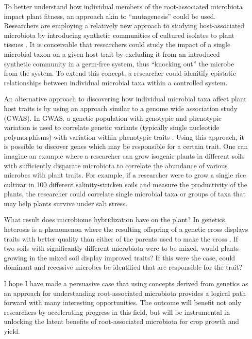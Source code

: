 To better understand how individual members of the root-associated microbiota impact plant fitness, an approach akin to ``mutagenesis'' could be used. Researchers are employing a relatively new approach to studying host-associated microbiota by introducing synthetic communities of cultured isolates to plant tissues \cite{bodenhausen2014synthetic,bai2015functional,lebeis2015salicylic}. It is conceivable that researchers could study the impact of a single microbial taxon on a given host trait by excluding it from an introduced synthetic community in a germ-free system, thus ``knocking out'' the microbe from the system. To extend this concept, a researcher could idenitify epistatic relationships between individual microbial taxa within a controlled system.

An alternative approach to discovering how individual microbial taxa affect plant host traits is by using an approach similar to a genome wide association study (GWAS). In GWAS, a genetic population with genotypic and phenotypic variation is used to correlate genetic variants (typically single nucleotide polymorphisms) with variation within phenotypic traits \cite{hardy2009genomewide}. Using this approach, it is possible to discover genes which may be responsible for a certain trait. One can imagine an example where a researcher can grow isogenic plants in different soils with sufficiently disparate microbiota to correlate the abundance of various microbes with plant traits. For example, if a researcher were to grow a single rice cultivar in 100 different salinity-stricken soils and measure the productivity of the plants, the researcher could correlate single microbial taxa or groups of taxa that may help plants survive under salt stress.

What result does microbiome hybridization have on the plant? In genetics, heterosis is a phenomenon where the resulting offspring of a genetic cross displays traits with better quality than either of the parents used to make the cross \cite{stuber1992identification}. If two soils with significantly different microbiota were to be mixed, would plants growing in the mixed soil display improved traits? If this were the case, could dominant and recessive microbes be identified that are responsible for the trait?

I hope I have made a persuasive case that using concepts derived from genetics as an approach for understanding root-associated microbiota provides a logical path forward with many interesting opportunities. The outcome will benefit not only researchers by accelerating progress in this field, but will be instrumental in unlocking the latent benefits of root-associated microbiota for crop growth and yield.
